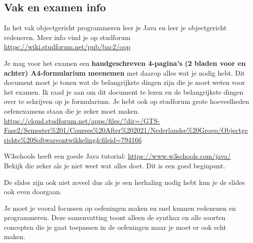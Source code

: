 \documentclass[a4paper,11pt]{article}
\title{\vaknaam}
\subtitle{Samenvatting + synthax}
\author{\auteur}
\date{\today}
\begin{document}
\ifdefined\shorthandoff{}\fi
\maketitle


\begin{abstract}
    Deze samenvattingen zijn beschikbaar op GitHub waar je kunt bijdragen aan verbeteringen: \url{https://github.com/KUL-Industriele-ingenieurs/Samenvattingen-Ku-leuven-Industriele-ingenieurs}

    Je bent helemaal vrij en ik raad je zelf aan om info toe te voegen aan de documenten als je de uitleg niet goed vindt.
    Je leert je vak en je raakt dan ook bekend met LaTeX wat handig is voor later.
\end{abstract}

\vspace{1cm}

\subsection{Vak en examen info}

In het vak objectgericht programmeren leer je Java en leer je objectgericht redeneren. Meer info vind je op studforum \url{https://wiki.studforum.net/pub/bac2/oop}

Je mag voor het examen een \textbf{handgeschreven
    4-pagina's (2 bladen voor en achter) A4-formularium meenemen} met daarop alles wat je nodig hebt.
Dit document moet je tonen wat de belangrijkste dingen zijn die je moet weten voor het examen.
Ik raad je aan om dit document te lezen en de belangrijkste dingen over te schrijven op je formularium.
Je hebt ook op studforum grote hoeveelheden oefenexamens staan die je zeker moet maken.
\url{https://cloud.studforum.net/apps/files/?dir=/GTS-Fase2/Semester%201/Courses%20After%202021/Nederlandse%20Groep/Objectgerichte%20Softwareontwikkeling&fileid=794166}
\newline

W3schools heeft een goede Java tutorial: \url{https://www.w3schools.com/java/}
Bekijk die zeker als je niet weet wat alles doet. Dit is een goed beginpunt.

De slides zijn ook niet zoveel dus als je een herhaling nodig hebt kun je de slides ook even doorgaan.

Je moet je vooral focussen op oefeningen maken en snel kunnen redenenen en programmeren. Deze samenvatting toont alleen de synthax en alle soorten
concepten die je gaat toepassen in de oefeningen maar je moet er ook echt maken.
\end{document}

